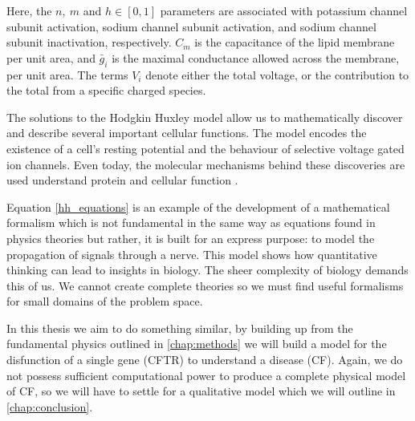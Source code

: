 Here, the $n,\ m$ and $h \in [0,1]$ parameters are associated with potassium channel subunit activation, sodium channel subunit activation, and sodium channel subunit inactivation, respectively. $C_m$ is the capacitance of the lipid membrane per unit area, and $\bar{g}_i$ is the maximal conductance allowed across the membrane, per unit area. The terms $V_i$ denote either the total voltage, or the contribution to the total from a specific charged species.

The solutions to the Hodgkin Huxley model allow us to mathematically discover and describe several important cellular functions. The model encodes the existence of a cell's resting potential and the behaviour of selective voltage gated ion channels. Even today, the molecular mechanisms behind these discoveries are used understand protein and cellular function \cite{aidley1996}. 

Equation \ref{hh_equations} is an example of the development of a mathematical formalism which is not fundamental in the same way as equations found in physics theories but rather, it is built for an express purpose: to model the propagation of signals through a nerve. This model shows how quantitative thinking can lead to insights in biology. The sheer complexity of biology demands this of us. We cannot create complete theories so we must find useful formalisms for small domains of the problem space.

In this thesis we aim to do something similar, by building up from the fundamental physics outlined in \ref{chap:methods} we will build a model for the disfunction of a single gene (CFTR) to understand a disease (CF). Again, we do not possess sufficient computational power to produce a complete physical model of CF, so we will have to settle for a qualitative model which we will outline in \ref{chap:conclusion}. 


